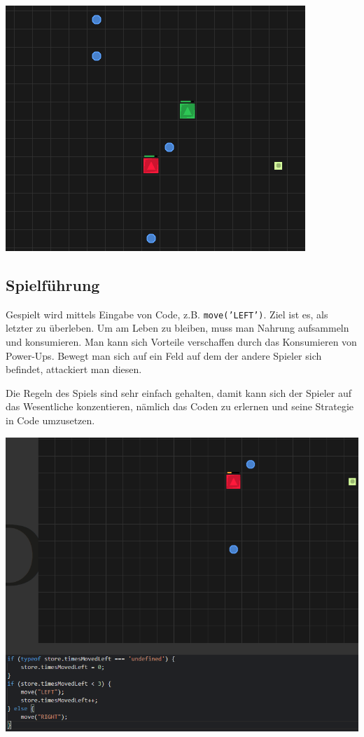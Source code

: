 \documentclass[11pt,a4paper,titlepage]{article}
\begin{document}
\includegraphics[width=\textwidth]{game1.png}

\subsection{Spielführung}

Gespielt wird mittels Eingabe von Code, z.B. \texttt{move('LEFT')}. Ziel ist es, als letzter zu überleben. Um am Leben zu bleiben, muss man Nahrung aufsammeln und konsumieren. Man kann sich Vorteile verschaffen durch das Konsumieren von Power-Ups. Bewegt man sich auf ein Feld auf dem der andere Spieler sich befindet, attackiert man diesen.

Die Regeln des Spiels sind sehr einfach gehalten, damit kann sich der Spieler auf das Wesentliche konzentieren, nämlich das Coden zu erlernen und seine Strategie in Code umzusetzen.

\includegraphics[width=\textwidth]{game2.png}
\end{document}
